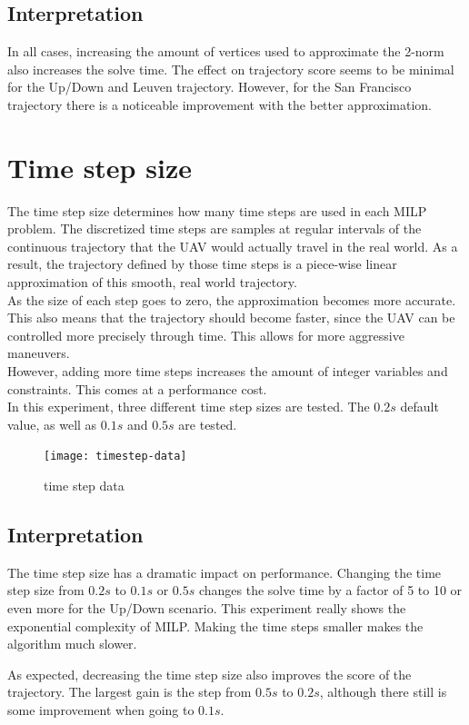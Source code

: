 \subsection{Interpretation}
In all cases, increasing the amount of vertices used to approximate the 2-norm also increases the solve time. The effect on trajectory score seems to be minimal for the Up/Down and Leuven trajectory. However, for the San Francisco trajectory there is a noticeable improvement with the better approximation.

\clearpage
\section{Time step size}
\label{subsec:timestep}
The time step size determines how many time steps are used in each MILP problem. The discretized time steps are samples at regular intervals of the continuous trajectory that the UAV would actually travel in the real world. As a result, the trajectory defined by those time steps is a piece-wise linear approximation of this smooth, real world trajectory. \\
As the size of each step goes to zero, the approximation becomes more accurate. This also means that the trajectory should become faster, since the UAV can be controlled more precisely through time. This allows for more aggressive maneuvers. \\
However, adding more time steps increases the amount of integer variables and constraints. This comes at a performance cost. \\
In this experiment, three different time step sizes are tested. The $0.2s$ default value, as well as $0.1s$ and $0.5s$ are tested.
\begin{figure}[]
	\centering
	\texttt{[image: timestep-data]}
	\caption{time step data}
	\label{fig:timestep-data}
\end{figure}
\subsection{Interpretation}
The time step size has a dramatic impact on performance. Changing the time step size from $0.2s$ to $0.1s$ or $0.5s$ changes the solve time by a factor of 5 to 10 or even more for the Up/Down scenario. This experiment really shows the exponential complexity of MILP. Making the time steps smaller makes the algorithm much slower.
\par
As expected, decreasing the time step size also improves the score of the trajectory. The largest gain is the step from $0.5s$ to $0.2s$, although there still is some improvement when going to $0.1s$.


